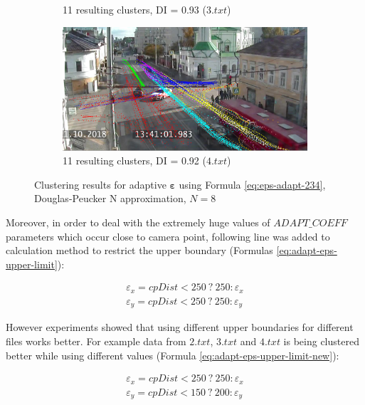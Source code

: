 \begin{figure}[!htb]
\begin{subfigure}[!htb]{0.23\textwidth}
		\caption{11 resulting clusters, DI = 0.93 ($3.txt$)}
		\label{fig:clust-res-1-rdp-n-diff-coeff-3}
	\end{subfigure}
	\hfill
	\begin{subfigure}[!htb]{0.23\textwidth}
		\centering{}
		\includegraphics[width=\textwidth]{images/cl-res/clust-res-1-rdp-n-diff-coeff-4.png}
		\caption{11 resulting clusters, DI = 0.92 ($4.txt$)}
		\label{fig:clust-res-1-rdp-n-diff-coeff-4}
	\end{subfigure}
	\caption{Clustering results for adaptive $\bm{\varepsilon}$ using Formula \ref{eq:eps-adapt-234}, Douglas-Peucker N approximation, $N = 8$}
	\label{fig:clust-res-1-rdp-n-diff-coeff}
\end{figure}

Moreover, in order to deal with the extremely huge values of $ADAPT\_COEFF$ parameters which occur close to camera point, following line was added to calculation method to restrict the upper boundary (Formulas \ref{eq:adapt-eps-upper-limit}):

\begin{subequations}\label{eq:adapt-eps-upper-limit}
	\begin{align}
		\varepsilon_x = cpDist < 250\ ?\ 250 : \varepsilon_x \\
		\varepsilon_y = cpDist < 250\ ?\ 250 : \varepsilon_y
	\end{align}
\end{subequations}

However experiments showed that using different upper boundaries for different files works better. For example data from $2.txt$, $3.txt$ and $4.txt$ is being clustered better while using different values (Formula \ref{eq:adapt-eps-upper-limit-new}):

\begin{subequations}\label{eq:adapt-eps-upper-limit-new}
	\begin{align}
	\varepsilon_x = cpDist < 250\ ?\ 250 : \varepsilon_x \\
	\varepsilon_y = cpDist < 150\ ?\ 200 : \varepsilon_y
	\end{align}
\end{subequations}

